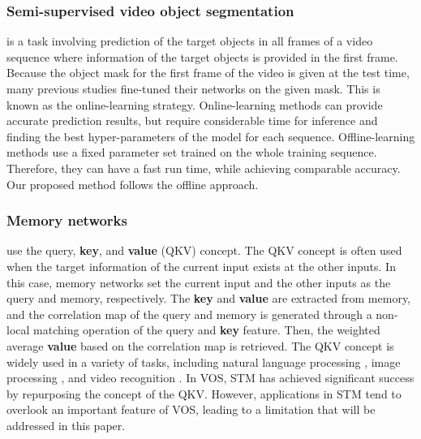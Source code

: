 \documentclass[runningheads]{llncs}
\begin{document}
\subsubsection{Semi-supervised video object segmentation}\cite{perazzi2016benchmark,pont20172017,xu2018youtube} is a task involving prediction of the target objects in all frames of a video sequence where information of the target objects is provided in the first frame. Because the object mask for the first frame of the video is given at the test time, many previous studies \cite{shin2017pixel,cheng2017segflow,perazzi2017learning,caelles2017one,hu2017maskrnn,ci2018video,bao2018cnn,luiten2018premvos,maninis2018video,voigtlaender2017online,li2018video,Wang_2019_ICCV} fine-tuned their networks on the given mask. This is known as the online-learning strategy. Online-learning methods can provide accurate prediction results, but require considerable time for inference and finding the best hyper-parameters of the model for each sequence. Offline-learning methods \cite{marki2016bilateral,jampani2017video,yang2018efficient,chen2018blazingly,voigtlaender2019feelvos,wug2018fast,cheng2018fast,Zhang_2019_ICCV,Oh_2019_ICCV} use a fixed parameter set trained on the whole training sequence. Therefore, they can have a fast run time, while achieving comparable accuracy. Our proposed method follows the offline approach.

\subsubsection{Memory networks}\cite{sukhbaatar2015end} use the query, \textbf{key}, and \textbf{value} (QKV) concept. The QKV concept is often used when the target information of the current input exists at the other inputs. In this case, memory networks set the current input and the other inputs as the query and memory, respectively. The \textbf{key} and \textbf{value} are extracted from memory, and the correlation map of the query and memory is generated through a non-local matching operation of the query and \textbf{key} feature. Then, the weighted average \textbf{value} based on the correlation map is retrieved. The QKV concept is widely used in a variety of tasks, including natural language processing \cite{vaswani2017attention,miller2016key,kumar2016ask}, image processing \cite{parmar2018image,Zhu_2019_ICCV}, and video recognition \cite{wang2018non,girdhar2019video,seong2019video}. In VOS, STM \cite{Oh_2019_ICCV} has achieved significant success by repurposing the concept of the QKV. However, applications in STM tend to overlook an important feature of VOS, leading to a limitation that will be addressed in this paper.
\end{document}
